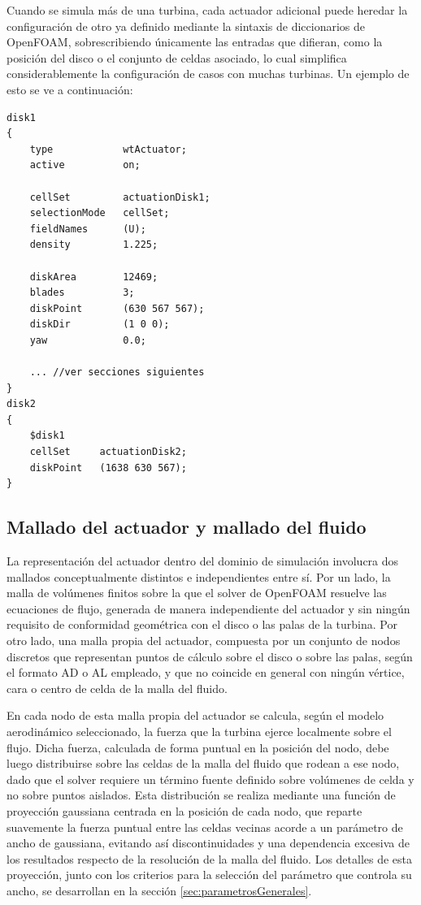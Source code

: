 Cuando se simula más de una turbina, cada actuador adicional puede heredar la configuración de otro ya definido mediante la sintaxis de diccionarios de OpenFOAM, sobrescribiendo únicamente las entradas que difieran, como la posición del disco o el conjunto de celdas asociado, lo cual simplifica considerablemente la configuración de casos con muchas turbinas. Un ejemplo de esto se ve a continuación:

\begin{scriptsize}
\begin{verbatim}
disk1
{
    type            wtActuator;
    active          on;

    cellSet         actuationDisk1;
    selectionMode   cellSet;
    fieldNames      (U);
    density         1.225;

    diskArea        12469;
    blades          3;
    diskPoint       (630 567 567);
    diskDir         (1 0 0);
    yaw             0.0;

	... //ver secciones siguientes
}
disk2
{
    $disk1
    cellSet     actuationDisk2;
    diskPoint   (1638 630 567);
}
\end{verbatim}
\end{scriptsize}


\subsection{Mallado del actuador y mallado del fluido \checkmark}
La representación del actuador dentro del dominio de simulación involucra dos mallados conceptualmente distintos e independientes entre sí. Por un lado, la malla de volúmenes finitos sobre la que el solver de OpenFOAM resuelve las ecuaciones de flujo, generada de manera independiente del actuador y sin ningún requisito de conformidad geométrica con el disco o las palas de la turbina. Por otro lado, una malla propia del actuador, compuesta por un conjunto de nodos discretos que representan puntos de cálculo sobre el disco o sobre las palas, según el formato AD o AL empleado, y que no coincide en general con ningún vértice, cara o centro de celda de la malla del fluido.

En cada nodo de esta malla propia del actuador se calcula, según el modelo aerodinámico seleccionado, la fuerza que la turbina ejerce localmente sobre el flujo. Dicha fuerza, calculada de forma puntual en la posición del nodo, debe luego distribuirse sobre las celdas de la malla del fluido que rodean a ese nodo, dado que el solver requiere un término fuente definido sobre volúmenes de celda y no sobre puntos aislados. Esta distribución se realiza mediante una función de proyección gaussiana centrada en la posición de cada nodo, que reparte suavemente la fuerza puntual entre las celdas vecinas acorde a un parámetro de ancho de gaussiana, evitando así discontinuidades y una dependencia excesiva de los resultados respecto de la resolución de la malla del fluido. Los detalles de esta proyección, junto con los criterios para la selección del parámetro que controla su ancho, se desarrollan en la sección \ref{sec:parametrosGenerales}.

